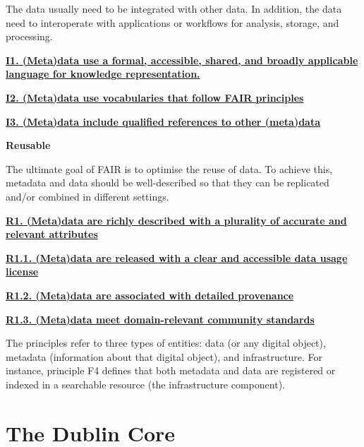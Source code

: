 \documentclass[
  a4paper,
  openany, a4paper, oneside]{book}
\begin{document}
The data usually need to be integrated with other data. In addition, the data need to interoperate with applications or workflows for analysis, storage, and processing.

\textbf{\href{https://www.go-fair.org/fair-principles/i1-metadata-use-formal-accessible-shared-broadly-applicable-language-knowledge-representation/}{I1. (Meta)data use a formal, accessible, shared, and broadly applicable language for knowledge representation.}}

\textbf{\href{https://www.go-fair.org/fair-principles/i2-metadata-use-vocabularies-follow-fair-principles/}{I2. (Meta)data use vocabularies that follow FAIR principles}}

\textbf{\href{https://www.go-fair.org/fair-principles/i3-metadata-include-qualified-references-metadata/}{I3. (Meta)data include qualified references to other (meta)data}}

\textbf{{R}eusable}

The ultimate goal of FAIR is to optimise the reuse of data. To achieve this, metadata and data should be well-described so that they can be replicated and/or combined in different settings.

\textbf{\href{https://www.go-fair.org/fair-principles/r1-metadata-richly-described-plurality-accurate-relevant-attributes/}{R1. (Meta)data are richly described with a plurality of accurate and relevant attributes}}

\textbf{\href{https://www.go-fair.org/fair-principles/r1-1-metadata-released-clear-accessible-data-usage-license/}{R1.1. (Meta)data are released with a clear and accessible data usage license}}

\textbf{\href{https://www.go-fair.org/fair-principles/r1-2-metadata-associated-detailed-provenance/}{R1.2. (Meta)data are associated with detailed provenance}}

\textbf{\href{https://www.go-fair.org/fair-principles/r1-3-metadata-meet-domain-relevant-community-standards/}{R1.3. (Meta)data meet domain-relevant community standards}}

The principles refer to three types of entities: data (or any digital object), metadata (information about that digital object), and infrastructure. For instance, principle F4 defines that both metadata and data are registered or indexed in a searchable resource (the infrastructure component).

\hypertarget{Dublin-Core}{%
\section{The Dublin Core}\label{Dublin-Core}}
\end{document}
